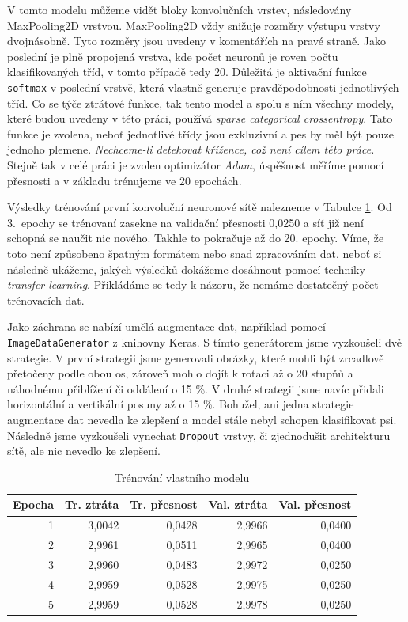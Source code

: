 \documentclass[a4paper,12pt]{article}
\begin{document}
V tomto modelu můžeme vidět bloky konvolučních vrstev, následovány MaxPooling2D vrstvou. MaxPooling2D vždy snižuje rozměry výstupu vrstvy dvojnásobně.  Tyto rozměry jsou uvedeny v komentářích na pravé straně. Jako poslední je plně propojená vrstva, kde počet neuronů je roven počtu klasifikovaných tříd, v tomto případě tedy 20. Důležitá je aktivační funkce \texttt{softmax} v poslední vrstvě, která vlastně generuje pravděpodobnosti jednotlivých tříd. Co se týče ztrátové funkce, tak tento model a spolu s ním všechny modely, které budou uvedeny v této práci, používá \emph{sparse categorical crossentropy}. Tato funkce je zvolena, neboť jednotlivé třídy jsou exkluzivní a pes by měl být pouze jednoho plemene. \emph{Nechceme-li detekovat křížence, což není cílem této práce.} Stejně tak v celé práci je zvolen optimizátor \emph{Adam}, úspěšnost měříme pomocí přesnosti a v základu trénujeme ve 20 epochách.

Výsledky trénování první konvoluční neuronové sítě nalezneme v Tabulce \ref{tab:first_cnn_train_res}. Od 3.~epochy se trénovaní zasekne na validační přesnosti 0,0250 a síť již není schopná se naučit nic nového. Takhle to pokračuje až do 20. epochy. Víme, že toto není způsobeno špatným formátem nebo snad zpracováním dat, neboť si následně ukážeme, jakých výsledků dokážeme dosáhnout pomocí techniky \emph{transfer learning}. Přikládáme se tedy k názoru, že nemáme dostatečný počet trénovacích dat.

Jako záchrana se nabízí umělá augmentace dat, například pomocí \texttt{ImageDataGenerator} z knihovny Keras. S tímto generátorem jsme vyzkoušeli dvě strategie. V první strategii jsme generovali obrázky, které mohli být zrcadlově přetočeny podle obou os, zároveň mohlo dojít k rotaci až o 20 stupňů a náhodnému přiblížení či oddálení o 15 \%. V druhé strategii jsme navíc přidali horizontální a vertikální posuny až o 15 \%. Bohužel, ani jedna strategie augmentace dat nevedla ke zlepšení a model stále nebyl schopen klasifikovat psi. Následně jsme vyzkoušeli vynechat \texttt{Dropout} vrstvy, či zjednodušit architekturu sítě, ale nic nevedlo ke zlepšení.

\begin{table}[h!]
    \centering
    \begin{tabular}{r | r | r | r | r}
    \toprule
    Epocha & Tr. ztráta & Tr. přesnost & Val. ztráta & Val. přesnost \\\midrule
    1       & 3,0042 & 0,0428 & 2,9966 & 0,0400 \\
    2       & 2,9961 & 0,0511 & 2,9965 & 0,0400 \\
    3       & 2,9960 & 0,0483 & 2,9972 & 0,0250 \\
    4       & 2,9959 & 0,0528 & 2,9975 & 0,0250 \\
    5       & 2,9959 & 0,0528 & 2,9978 & 0,0250 \\
    \bottomrule
    \end{tabular}
    \caption{Trénování vlastního modelu}
    \label{tab:first_cnn_train_res}
\end{table}
\end{document}
